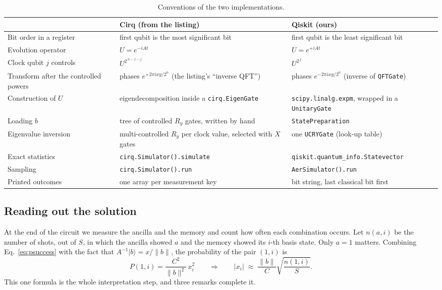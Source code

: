 \documentclass[manuscript,screen,review,nonacm]{acmart}
\newcommand{\ket}[1]{\lvert #1\rangle}
\newcommand{\norm}[1]{\lVert #1\rVert}
\newcommand{\code}[1]{\texttt{#1}}
\begin{document}
\begin{table}[t]
  \caption{Conventions of the two implementations.}
  \label{tab:conventions}
  \small
  \begin{tabular}{L{3.3cm}L{5.3cm}L{5.3cm}}
    \toprule
     & Cirq (from the listing) & Qiskit (ours) \\
    \midrule
    Bit order in a register & first qubit is the most significant bit
      & first qubit is the least significant bit \\
    Evolution operator & $U=e^{-iAt}$ & $U=e^{+iAt}$ \\
    Clock qubit $j$ controls & $U^{2^{\,n-1-j}}$ & $U^{2^{\,j}}$ \\
    Transform after the controlled powers & phases $e^{+2\pi i xy/2^n}$
      (the listing's ``inverse QFT'') & phases $e^{-2\pi i xy/2^n}$
      (inverse of \code{QFTGate}) \\
    Construction of $U$ & eigendecomposition inside a \code{cirq.EigenGate}
      & \code{scipy.linalg.expm}, wrapped in a \code{UnitaryGate} \\
    Loading $b$ & tree of controlled $R_y$ gates, written by hand
      & \code{StatePreparation} \\
    Eigenvalue inversion & multi-controlled $R_y$ per clock value, selected
      with $X$ gates & one \code{UCRYGate} (look-up table) \\
    Exact statistics & \code{cirq.Simulator().simulate}
      & \code{qiskit.quantum\_info.Statevector} \\
    Sampling & \code{cirq.Simulator().run} & \code{AerSimulator().run} \\
    Printed outcomes & one array per measurement key
      & bit string, last classical bit first \\
    \bottomrule
  \end{tabular}
\end{table}

\subsection{Reading out the solution}
\label{sec:readout}

At the end of the circuit we measure the ancilla and the memory and count how
often each combination occurs. Let $n(a,i)$ be the number of shots, out of $S$,
in which the ancilla showed $a$ and the memory showed its $i$-th basis state. Only
$a=1$ matters. Combining Eq.~\eqref{eq:psuccess} with the fact that
$A^{-1}\ket{b}=x/\norm{b}$, the probability of the pair $(1,i)$ is
\begin{equation}
  P(1,i)=\frac{C^2}{\norm{b}^2}\,x_i^2
  \qquad\Longrightarrow\qquad
  |x_i|\;\approx\;\frac{\norm{b}}{C}\sqrt{\frac{n(1,i)}{S}}.
  \label{eq:decode}
\end{equation}
This one formula is the whole interpretation step, and three remarks complete
it.
\end{document}
